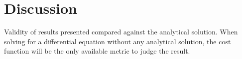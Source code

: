 \section{Discussion}


Validity of results presented compared against the analytical solution. When solving for a differential equation without any analytical solution, the cost function will be the only available metric to judge the result.